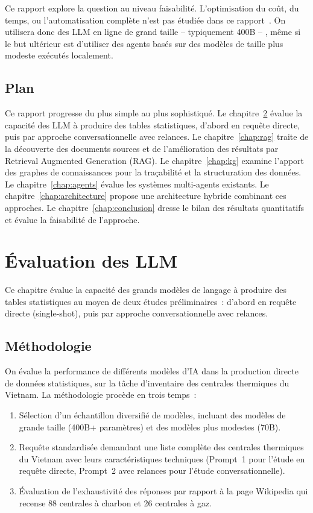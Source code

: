 \documentclass[a4paper,11pt]{report}
\begin{document}
Ce rapport explore la question au niveau faisabilité. L'optimisation du coût, du temps, ou l'automatisation complète n'est pas étudiée dans ce rapport~. On utilisera donc des LLM en ligne de grand taille -- typiquement 400B -- , même si le but ultérieur est d'utiliser des agents basés sur des modèles de taille plus modeste exécutés localement.

\section{Plan}

Ce rapport progresse du plus simple au plus sophistiqué. Le chapitre~\ref{chap:evaluation} évalue la capacité des LLM à produire des tables statistiques, d'abord en requête directe, puis par approche conversationnelle avec relances. Le chapitre~\ref{chap:rag} traite de la découverte des documents sources et de l'amélioration des résultats par Retrieval Augmented Generation (RAG). Le chapitre~\ref{chap:kg} examine l'apport des graphes de connaissances pour la traçabilité et la structuration des données. Le chapitre~\ref{chap:agents} évalue les systèmes multi-agents existants. Le chapitre~\ref{chap:architecture} propose une architecture hybride combinant ces approches. Le chapitre~\ref{chap:conclusion} dresse le bilan des résultats quantitatifs et évalue la faisabilité de l'approche.

\chapter{Évaluation des LLM}\label{chap:evaluation}

Ce chapitre évalue la capacité des grands modèles de langage à produire des tables statistiques au moyen de deux études préliminaires~: d'abord en requête directe (single-shot), puis par approche conversationnelle avec relances.

\section{Méthodologie}

On évalue la performance de différents modèles d'IA dans la production directe de données statistiques, sur la tâche d'inventaire des centrales thermiques du Vietnam. La méthodologie procède en trois temps~:

\begin{enumerate}
\item Sélection d'un échantillon diversifié de modèles, incluant des modèles de grande taille (400B+ paramètres) et des modèles plus modestes (70B).
\item Requête standardisée demandant une liste complète des centrales thermiques du Vietnam avec leurs caractéristiques techniques (Prompt~1 pour l'étude en requête directe, Prompt~2 avec relances pour l'étude conversationnelle).
\item Évaluation de l'exhaustivité des réponses par rapport à la page Wikipedia \citep{TQ8TFB8H} qui recense 88 centrales à charbon et 26 centrales à gaz.
\end{enumerate}
\end{document}
